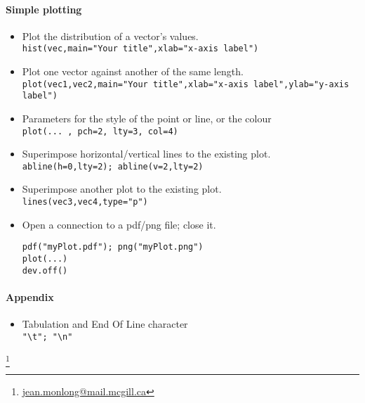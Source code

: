 \documentclass[12pt]{article}
\begin{document}
\paragraph{Simple plotting} 
\begin{itemize} 
  \item Plot the distribution of a vector's values. \\ 
    \verb!hist(vec,main="Your title",xlab="x-axis label")!
  \item Plot one vector against another of the same length. \\ 
    \verb!plot(vec1,vec2,main="Your title",xlab="x-axis label",ylab="y-axis label")!
  \item Parameters for the style of the point or line, or the colour \\ 
    \verb!plot(... , pch=2, lty=3, col=4)!
  \item Superimpose horizontal/vertical lines to the existing plot. \\ 
    \verb!abline(h=0,lty=2); abline(v=2,lty=2)!
  \item Superimpose another plot to the existing plot. \\ 
    \verb!lines(vec3,vec4,type="p")!
  \item Open a connection to a pdf/png file; close it.
\begin{verbatim}
pdf("myPlot.pdf"); png("myPlot.png")
plot(...)
dev.off()
\end{verbatim}
\end{itemize}


\paragraph{Appendix}
\begin{itemize} 
  \item Tabulation and End Of Line character \\ 
    \verb!"\t"; "\n"!
\end{itemize}

\let\thefootnote\relax\footnote{\href{mailto:jean.monlong@mail.mcgill.ca}{jean.monlong@mail.mcgill.ca}}
\end{document}

